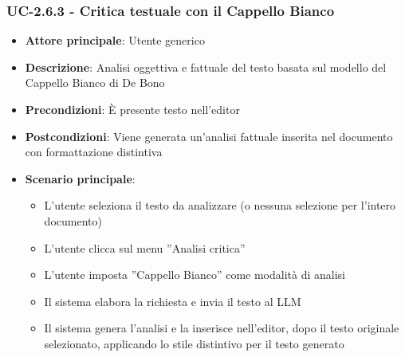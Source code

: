 \documentclass[11pt,a4paper]{article}
\begin{document}
\subsubsection{UC-2.6.3 - Critica testuale con il Cappello Bianco}
\begin{itemize}
    \item \textbf{Attore principale}: Utente generico
    \item \textbf{Descrizione}: Analisi oggettiva e fattuale del testo basata sul modello del Cappello Bianco di De Bono
    \item \textbf{Precondizioni}: È presente testo nell’editor
    \item \textbf{Postcondizioni}: Viene generata un’analisi fattuale inserita nel documento con formattazione distintiva
    \item \textbf{Scenario principale}:
    \begin{itemize}
        \item L’utente seleziona il testo da analizzare (o nessuna selezione per l'intero documento)
        \item L’utente clicca sul menu ”Analisi critica”
        \item L’utente imposta ”Cappello Bianco” come modalità di analisi
        \item Il sistema elabora la richiesta e invia il testo al LLM
        \item Il sistema genera l'analisi e la inserisce nell'editor, dopo il testo originale selezionato, applicando lo stile distintivo per il testo generato
    \end{itemize}
\end{itemize}
\end{document}

